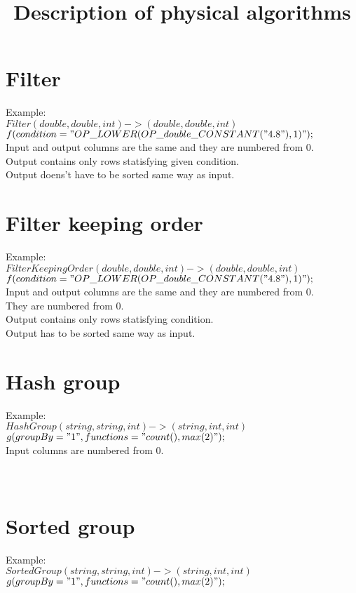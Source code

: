 \documentclass{article}
\begin{document}
\title{Description of physical algorithms}

\maketitle

\section{Filter}

Example: \\
$Filter(double,double,int)->(double,double,int)$\\
$f(condition="OP\_LOWER(OP\_double\_CONSTANT("4.8"),1)"); $\\
Input and output columns are the same and they are numbered from 0.\\
Output contains only rows statisfying given condition.\\
Output doens't have to be sorted same way as input. \\

\section{Filter keeping order}

Example: \\
$FilterKeepingOrder(double,double,int)->(double,double,int)$ \\
$f(condition="OP\_LOWER(OP\_double\_CONSTANT("4.8"),1)"); $ \\
Input and output columns are the same and they are numbered from 0.\\
They are numbered from 0.\\
Output contains only rows statisfying condition. \\
Output has to be sorted same way as input. \\

\section{Hash group}
Example: \\  
$HashGroup(string,string,int)->(string,int,int)$ \\
$g(groupBy="1",functions="count(),max(2)");$ \\
Input columns are numbered from 0.\\
\\
\\
\section{Sorted group}
Example: \\  
$SortedGroup(string,string,int)->(string,int,int)$ \\
$g(groupBy="1",functions="count(),max(2)");$ \\
\end{document}
